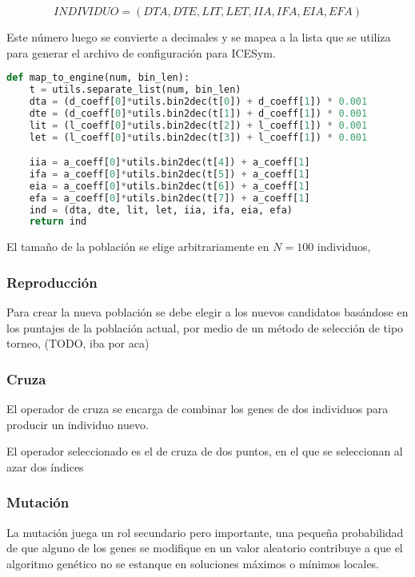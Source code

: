 \begin{equation}
    INDIVIDUO = (DTA, DTE, LIT, LET, IIA, IFA, EIA, EFA) \nonumber
\end{equation}

Este número luego se convierte a decimales y se mapea a la lista que se utiliza
para generar el archivo de configuración para ICESym.
%

\begin{lstlisting}[language=Python]
def map_to_engine(num, bin_len):
    t = utils.separate_list(num, bin_len)
    dta = (d_coeff[0]*utils.bin2dec(t[0]) + d_coeff[1]) * 0.001
    dte = (d_coeff[0]*utils.bin2dec(t[1]) + d_coeff[1]) * 0.001
    lit = (l_coeff[0]*utils.bin2dec(t[2]) + l_coeff[1]) * 0.001
    let = (l_coeff[0]*utils.bin2dec(t[3]) + l_coeff[1]) * 0.001

    iia = a_coeff[0]*utils.bin2dec(t[4]) + a_coeff[1]
    ifa = a_coeff[0]*utils.bin2dec(t[5]) + a_coeff[1]
    eia = a_coeff[0]*utils.bin2dec(t[6]) + a_coeff[1]
    efa = a_coeff[0]*utils.bin2dec(t[7]) + a_coeff[1]
    ind = (dta, dte, lit, let, iia, ifa, eia, efa)
    return ind
\end{lstlisting}

El tamaño de la población se elige arbitrariamente en $N=100$ individuos, 

\subsubsection{Reproducción}

Para crear la nueva población se debe elegir a los nuevos candidatos basándose
en los puntajes de la población actual, por medio de un método de selección de
tipo torneo, (TODO, iba por aca)
%


\subsubsection{Cruza}
%
El operador de cruza se encarga de combinar los genes de dos individuos para
producir un individuo nuevo.

El operador seleccionado es el de cruza de dos puntos, en el que se seleccionan
al azar dos índices


\subsubsection{Mutación}
%
La mutación juega un rol secundario pero importante, una pequeña probabilidad
de que alguno de los genes se modifique en un valor aleatorio contribuye a que
el algoritmo genético no se estanque en soluciones máximos o mínimos locales.

